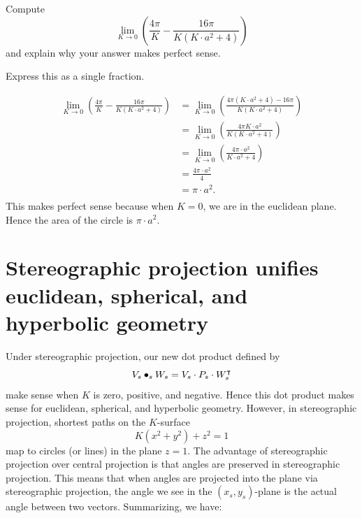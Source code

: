 \documentclass{ximera}
\begin{document}
\begin{problem}
  Compute
  \[
  \lim_{K\to 0} \left(\frac{4\pi}{K}-\frac{16\pi}{K\left(K\cdot a^2+4\right)}\right)
  \]
  and explain why your answer makes perfect sense.
  \begin{hint}
    Express this as a single fraction.
  \end{hint}
  \begin{freeResponse}
    \begin{align*}
    \lim_{K\to 0} \left(\frac{4\pi}{K}-\frac{16\pi}{K\left(K\cdot a^2+4\right)}\right)
    &= \lim_{K\to 0} \left(\frac{4\pi\left(K\cdot a^2+4\right) - 16\pi}{K\left(K\cdot a^2+4\right)}\right)\\
    &= \lim_{K\to 0} \left(\frac{4\pi K\cdot a^2}{K\left(K\cdot a^2+4\right)}\right)\\
    &= \lim_{K\to 0} \left(\frac{4\pi\cdot a^2}{K\cdot a^2+4}\right)\\
    &= \frac{4\pi\cdot a^2}{4}\\
    &= \pi\cdot a^2.\\
    \end{align*}
    This makes perfect sense because when $K=0$, we are in the
    euclidean plane. Hence the area of the circle is $\pi\cdot a^2$.
  \end{freeResponse}
\end{problem}




\section{Stereographic projection unifies euclidean, spherical, and hyperbolic geometry}


Under stereographic projection, our new dot product defined by
\[
V_s\bullet_s W_s = V_s\cdot P_s\cdot W_s^\intercal
\]
make sense when $K$ is zero, positive, and negative. Hence this dot
product makes sense for euclidean, spherical, and hyperbolic
geometry. However, in stereographic projection, shortest paths on the
$K$-surface
\[
K\left(x^2 + y^2\right) + z^2 = 1
\]
map to circles (or lines) in the plane $z=1$. The advantage of
stereographic projection over central projection is that angles are
preserved in stereographic projection. This means that when angles are
projected into the plane via stereographic projection, the angle we
see in the $(x_s,y_s)$-plane is the actual angle between two
vectors. Summarizing, we have:
\end{document}
